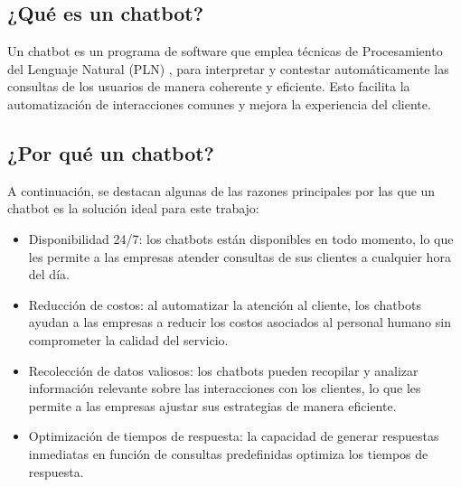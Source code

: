 \subsection{¿Qué es un chatbot?}

Un chatbot es un programa de software que emplea técnicas de Procesamiento del Lenguaje Natural (PLN) \citep{ibm-pln}, para interpretar y contestar automáticamente las consultas de los usuarios de manera coherente y eficiente. Esto facilita la automatización de interacciones comunes y mejora la experiencia del cliente.


\subsection{¿Por qué un chatbot?}

A continuación, se destacan algunas de las razones principales por las que un chatbot es la solución ideal para este trabajo:

\begin{itemize}
    \item Disponibilidad 24/7: los chatbots están disponibles en todo momento, lo que les permite a las empresas atender consultas de sus clientes a cualquier hora del día.
    
    \item Reducción de costos: al automatizar la atención al cliente, los chatbots ayudan a las empresas a reducir los costos asociados al personal humano sin comprometer la calidad del servicio.
    
    \item Recolección de datos valiosos: los chatbots pueden recopilar y analizar información relevante sobre las interacciones con los clientes, lo que les permite a las empresas ajustar sus estrategias de manera eficiente.
    
    \item Optimización de tiempos de respuesta: la capacidad de generar respuestas inmediatas en función de consultas predefinidas optimiza los tiempos de respuesta.
\end{itemize}




